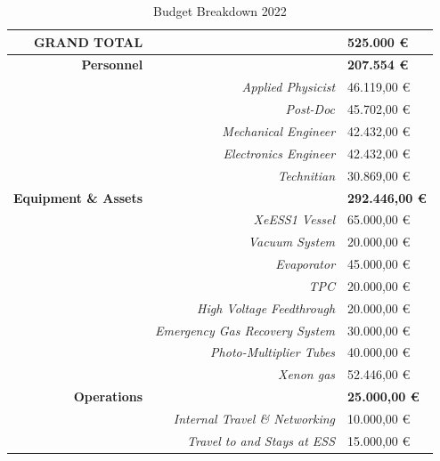 \documentclass[12pt,a4paper,article]{report} %
\begin{document}
			
\begin{table}[htp]
\caption{Budget Breakdown 2022}
\begin{center}
\begin{tabular}{r   r  l }

\textbf{GRAND TOTAL}&& \textbf{525.000 \euro{}}  \\ \hline \hline
\textbf{Personnel}&& \textbf{207.554 \euro{}}  \\ \hline 
&\emph{Applied Physicist} & 46.119,00 \euro{}\\ 
&\emph{Post-Doc} & 45.702,00 \euro{} \\ 
&\emph{Mechanical Engineer} & 42.432,00  \euro{}  \\
&\emph{Electronics Engineer} & 42.432,00 \euro{} \\
&\emph{Technitian} & 30.869,00 \euro{} \\ \hline 
\textbf{Equipment \& Assets}&& \textbf{292.446,00   \euro{}}  \\ \hline
&\emph{XeESS1 Vessel} & 65.000,00 \euro{}\\ 
&\emph{Vacuum System} & 20.000,00 \euro{} \\ 
&\emph{Evaporator} & 45.000,00  \euro{}  \\
&\emph{TPC} & 20.000,00 \euro{} \\
&\emph{High Voltage Feedthrough} & 20.000,00 \euro{} \\ 
&\emph{Emergency Gas Recovery System} & 30.000,00 \euro{} \\ 
&\emph{Photo-Multiplier Tubes} & 40.000,00 \euro{} \\ 
&\emph{Xenon gas} & 52.446,00 \euro{} \\ \hline 
\textbf{Operations}&& \textbf{25.000,00   \euro{}}  \\ \hline 
&\emph{Internal Travel \& Networking} & 10.000,00 \euro{}\\ 
&\emph{Travel to and Stays at ESS} & 15.000,00 \euro{} \\ 

\end{tabular}
\end{center}
\label{budget2022}
\end{table}%
			
			
\end{document}
